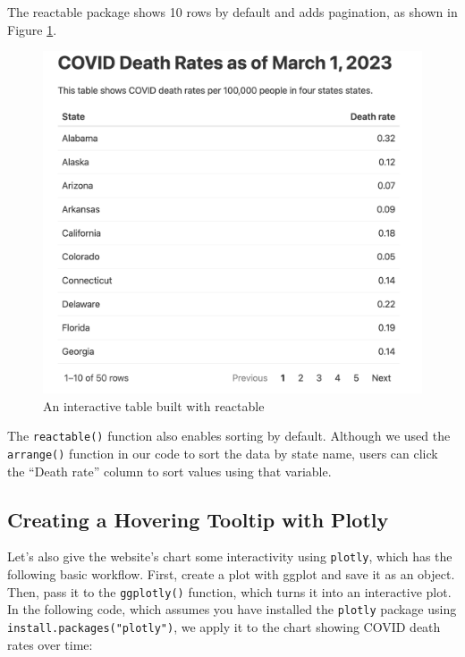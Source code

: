 \documentclass[
]{book}
\begin{document}
The reactable package shows 10 rows by default and adds pagination, as shown in Figure \ref{fig:covid-website-reactable}.

\begin{figure}
\includegraphics[width=1\linewidth]{assets/covid-website-reactable} \caption{An interactive table built with reactable}\label{fig:covid-website-reactable}
\end{figure}

The \texttt{reactable()} function also enables sorting by default. Although we used the \texttt{arrange()} function in our code to sort the data by state name, users can click the ``Death rate'' column to sort values using that variable.

\hypertarget{creating-a-hovering-tooltip-with-plotly}{%
\subsection*{Creating a Hovering Tooltip with Plotly}\label{creating-a-hovering-tooltip-with-plotly}}

Let's also give the website's chart some interactivity using \texttt{plotly}, which has the following basic workflow. First, create a plot with ggplot and save it as an object. Then, pass it to the \texttt{ggplotly()} function, which turns it into an interactive plot. In the following code, which assumes you have installed the \texttt{plotly} package using \texttt{install.packages("plotly")}, we apply it to the chart showing COVID death rates over time:
\end{document}
